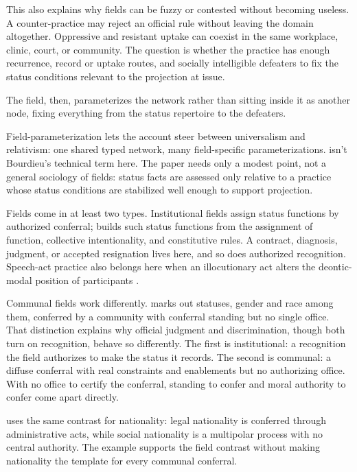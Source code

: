 \documentclass[12pt]{article}
\begin{document}
This also explains why fields can be fuzzy or contested without becoming useless. A counter-practice may reject an official rule without leaving the domain altogether. Oppressive and resistant uptake can coexist in the same workplace, clinic, court, or community. The question is whether the practice has enough recurrence, record or uptake routes, and socially intelligible defeaters to fix the status conditions relevant to the projection at issue.

The field, then, parameterizes the network rather than sitting inside it as another node, fixing everything from the status repertoire to the defeaters.

Field-parameterization lets the account steer between universalism and relativism: one shared typed network, many field-specific parameterizations.  isn't Bourdieu's technical term here. The paper needs only a modest point, not a general sociology of fields: status facts are assessed only relative to a practice whose status conditions are stabilized well enough to support projection.

Fields come in at least two types. Institutional fields assign status functions by authorized conferral; \textcite{searle1995Construction} builds such status functions from the assignment of function, collective intentionality, and constitutive rules. A contract, diagnosis, judgment, or accepted resignation lives here, and so does authorized recognition. Speech-act practice also belongs here when an illocutionary act alters the deontic-modal position of participants \citep{sbisa2023OnIllocutionaryTypes}.

Communal fields work differently. \textcite{asta2018Categories} marks out statuses, gender and race among them, conferred by a community with conferral standing but no single office. That distinction explains why official judgment and discrimination, though both turn on recognition, behave so differently. The first is institutional: a recognition the field authorizes to make the status it records. The second is communal: a diffuse conferral with real constraints and enablements but no authorizing office. With no office to certify the conferral, standing to confer and moral authority to confer come apart directly.

\textcite[pp.~42--43]{behrensen2018MakingUpPeoples} uses the same contrast for nationality: legal nationality is conferred through administrative acts, while social nationality is a multipolar process with no central authority. The example supports the field contrast without making nationality the template for every communal conferral.
\end{document}
